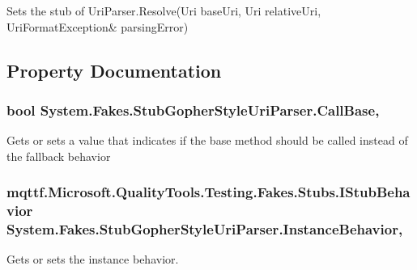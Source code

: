 Sets the stub of Uri\-Parser.\-Resolve(Uri base\-Uri, Uri relative\-Uri, Uri\-Format\-Exception\& parsing\-Error)



\subsection{Property Documentation}
\hypertarget{class_system_1_1_fakes_1_1_stub_gopher_style_uri_parser_a7003921342be1783d3c81c8a6fa53ffb}{
\subsubsection[{Call\-Base}]{\setlength{\rightskip}{0pt plus 5cm}bool System.\-Fakes.\-Stub\-Gopher\-Style\-Uri\-Parser.\-Call\-Base\hspace{0.3cm}{\ttfamily [get]}, {\ttfamily [set]}}}\label{class_system_1_1_fakes_1_1_stub_gopher_style_uri_parser_a7003921342be1783d3c81c8a6fa53ffb}


Gets or sets a value that indicates if the base method should be called instead of the fallback behavior

\hypertarget{class_system_1_1_fakes_1_1_stub_gopher_style_uri_parser_a3992112bf103b1cbf51621bbc79e54d9}{
\subsubsection[{Instance\-Behavior}]{\setlength{\rightskip}{0pt plus 5cm}mqttf.\-Microsoft.\-Quality\-Tools.\-Testing.\-Fakes.\-Stubs.\-I\-Stub\-Behavior System.\-Fakes.\-Stub\-Gopher\-Style\-Uri\-Parser.\-Instance\-Behavior\hspace{0.3cm}{\ttfamily [get]}, {\ttfamily [set]}}}\label{class_system_1_1_fakes_1_1_stub_gopher_style_uri_parser_a3992112bf103b1cbf51621bbc79e54d9}


Gets or sets the instance behavior.

